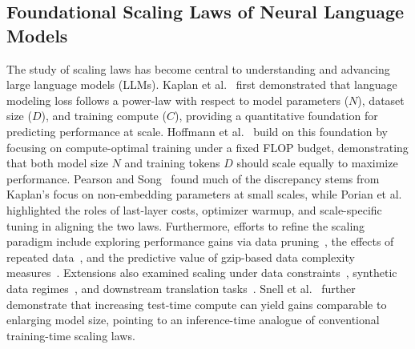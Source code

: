 \subsection{Foundational Scaling Laws of Neural Language Models}
The study of scaling laws has become central to understanding and advancing large language models (LLMs). Kaplan et al.~\citep{kaplan2020scaling} first demonstrated that language modeling loss follows a power-law with respect to model parameters ($N$), dataset size ($D$), and training compute ($C$), providing a quantitative foundation for predicting performance at scale. Hoffmann et al.~\citep{hoffmann2022training} build on this foundation by focusing on compute-optimal training under a fixed FLOP budget, demonstrating that both model size \(N\) and training tokens \(D\) should scale equally to maximize performance. Pearson and Song~\citep{pearce2024reconciling} found much of the discrepancy stems from Kaplan’s focus on non-embedding parameters at small scales, while Porian et al.~\citep{porian2024resolving} highlighted the roles of last-layer costs, optimizer warmup, and scale-specific tuning in aligning the two laws. Furthermore, efforts to refine the scaling paradigm include exploring performance gains via data pruning~\citep{sorscher2022beyond}, the effects of repeated data~\citep{hernandez2022scaling}, and the predictive value of gzip-based data complexity measures~\citep{pandey2024gzip}. Extensions also examined scaling under data constraints~\citep{muennighoff2023scaling}, synthetic data regimes~\citep{qin2025scaling}, and downstream translation tasks~\citep{isik2024scaling}. Snell et al.~\citep{snell2024scaling} further demonstrate that increasing test-time compute can yield gains comparable to enlarging model size, pointing to an inference-time analogue of conventional training-time scaling laws.

